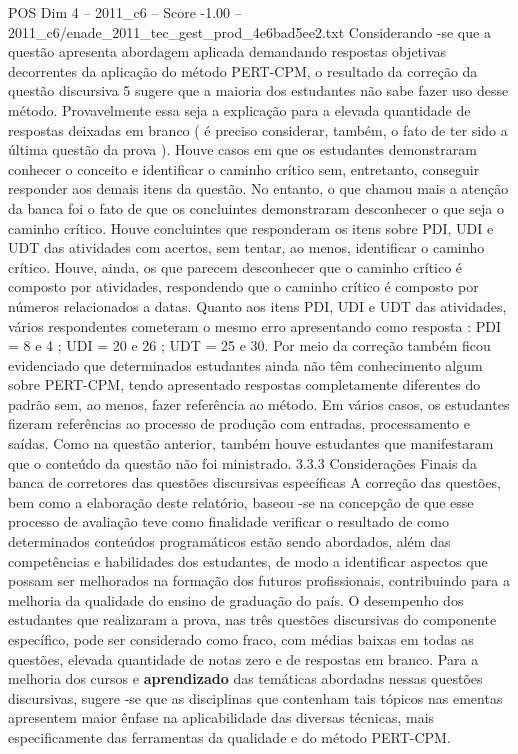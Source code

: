 \begin{textsample}{POS Dim 4 – 2011\_c6 – Score -1.00 – 2011\_c6/enade\_2011\_tec\_gest\_prod\_4e6bad5ee2.txt}
Considerando -se que a questão apresenta abordagem aplicada demandando respostas objetivas decorrentes da aplicação do método PERT-CPM, o resultado da correção da questão discursiva 5 sugere que a maioria dos estudantes não sabe fazer uso desse método.
Provavelmente essa seja a explicação para a elevada quantidade de respostas deixadas em branco ( é preciso considerar, também, o fato de ter sido a última questão da prova ).
Houve casos em que os estudantes demonstraram conhecer o conceito e identificar o caminho crítico sem, entretanto, conseguir responder aos demais itens da questão.
No entanto, o que chamou mais a atenção da banca foi o fato de que os concluintes demonstraram desconhecer o que seja o caminho crítico.
Houve concluintes que responderam os itens sobre PDI, UDI e UDT das atividades com acertos, sem tentar, ao menos, identificar o caminho crítico.
Houve, ainda, os que parecem desconhecer que o caminho crítico é composto por atividades, respondendo que o caminho crítico é composto por números relacionados a datas.
Quanto aos itens PDI, UDI e UDT das atividades, vários respondentes cometeram o mesmo erro apresentando como resposta : PDI = 8 e 4 ; UDI = 20 e 26 ; UDT = 25 e 30.
Por meio da correção também ficou evidenciado que determinados estudantes ainda não têm conhecimento algum sobre PERT-CPM, tendo apresentado respostas completamente diferentes do padrão sem, ao menos, fazer referência ao método.
Em vários casos, os estudantes fizeram referências ao processo de produção com entradas, processamento e saídas.
Como na questão anterior, também houve estudantes que manifestaram que o conteúdo da questão não foi ministrado. 3.3.3 Considerações Finais da banca de corretores das questões discursivas específicas A correção das questões, bem como a elaboração deste relatório, baseou -se na concepção de que esse processo de avaliação teve como finalidade verificar o resultado de como determinados conteúdos programáticos estão sendo abordados, além das competências e habilidades dos estudantes, de modo a identificar aspectos que possam ser melhorados na formação dos futuros profissionais, contribuindo para a melhoria da qualidade do ensino de graduação do país.
O desempenho dos estudantes que realizaram a prova, nas três questões discursivas do componente específico, pode ser considerado como fraco, com médias baixas em todas as questões, elevada quantidade de notas zero e de respostas em branco.
Para a melhoria dos cursos e \textbf{aprendizado} das temáticas abordadas nessas questões discursivas, sugere -se que as disciplinas que contenham tais tópicos nas ementas apresentem maior ênfase na aplicabilidade das diversas técnicas, mais especificamente das ferramentas da qualidade e do método PERT-CPM.

\end{textsample}
